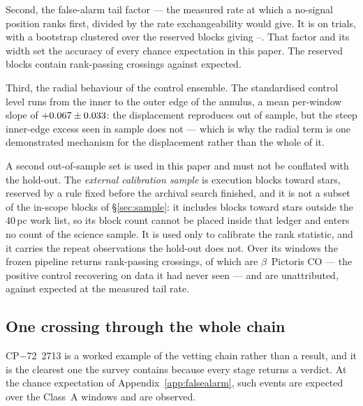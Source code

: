 Second, the false-alarm tail factor --- the measured rate at which a
no-signal position ranks first, divided by the rate exchangeability would
give. It is \HoTailFactor{} on \HoPseudoTrials{} trials, with a bootstrap
clustered over the \HoTailBlocks{} reserved blocks giving
\HoTailLo--\HoTailHi. That factor and its width set the accuracy of every
chance expectation in this paper. The reserved blocks contain \HoStageOne{}
rank-passing crossings against \HoStageOneExp{} expected.

Third, the radial behaviour of the control ensemble. The standardised
control level runs \HoRadBins{} from the inner to the outer edge of the
annulus, a mean per-window slope of $+0.067\pm0.033$: the
displacement reproduces out of sample, but the steep inner-edge excess seen
in sample does not --- which is why the radial term is one demonstrated
mechanism for the displacement rather than the whole of it.

A second out-of-sample set is used in this paper and must not be conflated
with the hold-out. The \emph{external calibration sample} is \CampBlocks{}
execution blocks toward \CampStars{} stars, reserved by a rule fixed before
the archival search finished, and it is not a subset of the in-scope blocks
of \S\ref{sec:sample}: it includes blocks toward stars outside the 40\,pc
work list, so its block count cannot be placed inside that ledger and enters
no count of the science sample. It is used only to calibrate the rank
statistic, and it carries the repeat observations the hold-out does not. Over
its \CampWindows{} windows the frozen pipeline returns \CampStageOne{}
rank-passing crossings, of which \CampStageOneCO{} are $\beta$~Pictoris CO
--- the positive control recovering on data it had never seen --- and
\CampUnattrib{} are unattributed, against \CampExpUn{} expected at the
measured tail rate.

\subsection{One crossing through the whole chain}

CP$-$72~2713 is a worked example of the vetting chain rather than a result,
and it is the clearest one the survey contains because every stage returns a
verdict. At the chance expectation of Appendix~\ref{app:falsealarm},
\ClustStageMean{} such events are expected over the Class~A windows and
\NStageOneUnattrib{} are observed.

